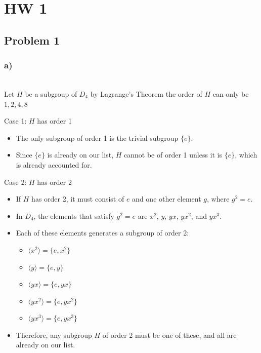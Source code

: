 \documentclass[12pt, letterpaper]{article}
\theoremstyle{definition}
\begin{document}
\pagestyle{fancy}
\fancyhf{}
\fancyhead[ROE]{\thepage}

\section*{HW 1}

\subsection*{Problem 1}
\subsubsection*{a)}
\phantom{text}\\
Let $H$ be a subgroup of $D_4$ by Lagrange's Theorem the order of $H$ can only be $1,2,4,8$

Case 1: \(H\) has order 1
\begin{itemize}
    \item The only subgroup of order 1 is the trivial subgroup \( \{e\} \).
    \item Since \( \{e\} \) is already on our list, \( H \) cannot be of order 1 unless it is \( \{e\} \), which is already accounted for.
\end{itemize}

Case 2: \(H\) has order 2
\begin{itemize}
    \item If \( H \) has order 2, it must consist of \( e \) and one other element \( g \), where \( g^2 = e \).
    \item In \( D_4 \), the elements that satisfy \( g^2 = e \) are \( x^2 \), \( y \), \( yx \), \( yx^2 \), and \( yx^3 \).
    \item Each of these elements generates a subgroup of order 2:
    \begin{itemize}
        \item \( \langle x^2 \rangle = \{ e, x^2 \} \)
        \item \( \langle y \rangle = \{ e, y \} \)
        \item \( \langle yx \rangle = \{ e, yx \} \)
        \item \( \langle yx^2 \rangle = \{ e, yx^2 \} \)
        \item \( \langle yx^3 \rangle = \{ e, yx^3 \} \)
    \end{itemize}
    \item Therefore, any subgroup \( H \) of order 2 must be one of these, and all are already on our list.
\end{itemize}
\end{document}

